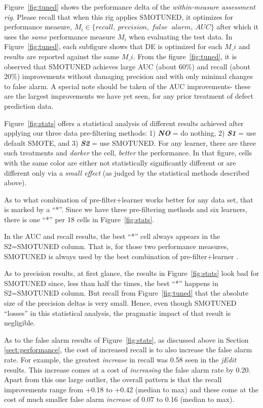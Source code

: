 \documentclass[sigconf,review, anonymous]{acmart}
\theoremstyle{break}
\theoremstyle{break}
\newcommand{\tion}[1]{{Section }\ref{sect:#1}}
\newcommand{\sma}{{\sc SMOTE}}
\newcommand{\smb}{{\sc SMOTUNED}}
\begin{document}
Figure~\ref{fig:tuned} shows the performance delta of the {\em within-measure assessment rig}.
Please recall that when this rig applies {\smb}, it optimizes for performance measure, $M_i \in \{recall,\ precision,\ false$ $\ alarm,\ AUC\}$
after which it uses the {\em same} performance measure
$M_i$ when evaluating the test data. In Figure~\ref{fig:tuned}, each subfigure shows that DE is optimized for each $M\_i$ and results are reported against the same $M\_i$.
From the figure~\ref{fig:tuned}, it is observed that
{\smb} achieves large AUC (about 60\%) and recall (about 20\%) improvements
without
 damaging precision and  with only minimal changes
 to false alarm. A special note should be taken of the AUC improvements- these are the largest improvements
 we have yet seen, for any prior treatment of defect prediction data.

Figure~\ref{fig:stats} offers a statistical analysis
of different results achieved
after applying our three data pre-filtering methods: 1) {\em \textbf{NO}} = do nothing, 2) {\em \textbf{S1}} = use default {\sma}, and 3) {\em \textbf{S2}} = use {\smb}.
For any learner, there are three such treatments and {\em darker} the cell, {\em better} the performance. 
In that figure, cells with the same color are
either not statistically significantly different or
are different only via a {\em small effect}
(as judged by the statistical methods described above).

As to what combination of pre-filter+learner works better for any data set, that is marked by a ``*''. Since we have three pre-filtering methods and six learners, there is one   ``*'' per 18 cells in Figure~\ref{fig:stats}.

In the  AUC and recall results,  the best ``*'' cell always appears in the S2={\smb} column. 
That is, for those two performance measures,  {\smb} is always
used by the best combination of pre-filter+learner .

As to precision  results,  at first glance, the  results in Figure~\ref{fig:stats} look bad for {\smb} since, less than half the times, 
the best ``*''  happens  in S2={\smb} column.
 But recall from Figure~\ref{fig:tuned} that the absolute size of the precision deltas is very small.  Hence, even though {\smb} ``losses'' in this statistical analysis, the pragmatic impact of that result  is  negligible.
 
As to the false alarm results of Figure~\ref{fig:stats}, as discussed above in \tion{performance}, the cost of increased recall is to also increase
the false alarm rate. For example, the greatest \textit{increase} in recall was 0.58 seen in the {\em jEdit} results. This increase comes at a cost
of \textit{increasing} the false alarm rate by 0.20. Apart from this one large outlier, the overall pattern is that the recall improvements range from +0.18 to +0.42 (median to max)
and these come at the cost of much smaller false alarm \textit{increase} of 0.07 to 0.16 (median to max). 
 
\end{document}
